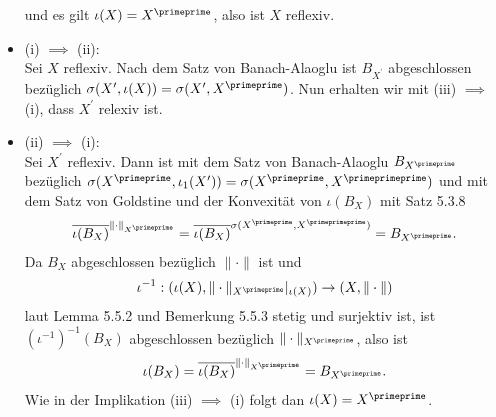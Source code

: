 \begin{solution}
\begin{itemize}
  und es gilt $\iota(X) = X^{\primeprime}$, also ist $X$ reflexiv.
  \item (i) $\implies$ (ii): \\
  Sei $X$ reflexiv. Nach dem Satz von Banach-Alaoglu ist $B_{X^{\prime}}$ abgeschlossen
  bezüglich $\sigma(X^{\prime}, \iota(X)) = \sigma(X^{\prime},X^{\primeprime})$.
  Nun erhalten wir mit (iii) $\implies$ (i), dass $X^{\prime}$ relexiv ist.
  \item (ii) $\implies$ (i): \\
  Sei $X^{\prime}$ reflexiv. Dann ist mit dem Satz von Banach-Alaoglu $B_{X^{\primeprime}}$
  bezüglich $\sigma(X^{\primeprime}, \iota_1(X^{\prime})) = \sigma(X^{\primeprime}, X^{\primeprimeprime})$
  und mit dem Satz von Goldstine und der Konvexität von $\iota(B_X)$ mit Satz 5.3.8
  \begin{align*}
    \overline{\iota(B_X)}^{\|\cdot\|_{X^{\primeprime}}}
    = \overline{\iota(B_X)}^{\sigma(X^{\primeprime},X^{\primeprimeprime})} = B_{X^{\primeprime}}.
  \end{align*}
  Da $B_X$ abgeschlossen bezüglich $\|\cdot\|$ ist und
  \begin{align*}
    \iota^{-1}: (\iota(X), \|\cdot\|_{X^{\primeprime}}|_{\iota(X)}) \to (X,\|\cdot\|)
  \end{align*}
  laut Lemma 5.5.2 und Bemerkung 5.5.3
  stetig und surjektiv ist, ist $(\iota^{-1})^{-1}(B_X)$ abgeschlossen bezüglich $\|\cdot\|_{X^{\primeprime}}$,
  also ist
  \begin{align*}
    \iota(B_X) = \overline{\iota(B_X)}^{\|\cdot\|_{X^{\primeprime}}} = B_{X^{\primeprime}}.
  \end{align*}
  Wie in der Implikation (iii) $\implies$ (i) folgt dan $\iota(X) = X^{\primeprime}$.
 \end{itemize}
\end{solution}
